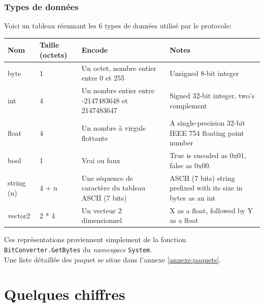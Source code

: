 \documentclass[a4paper]{article}
\begin{document}
\subsubsection{Types de données}
Voici un tableau résumant les 6 types de données utilisé par le protocole:
\begin{center}
\begin{tabular}{|l|m{1.5cm}|m{5cm}|m{5cm}|}
    \hline
    Nom & Taille (octets) & Encode & Notes \\
    \hline\hline
    byte & 1 & Un octet, nombre entier entre 0 et 255 & Unsigned 8-bit integer \\
    \hline
    int & 4 & Un nombre entier entre \mbox{-2147483648} et 2147483647  & Signed 32-bit integer, two's complement \\
    \hline
    float & 4 & Un nombre à virgule flottante & A single-precision 32-bit IEEE 754 floating point number \\
    \hline
    bool & 1 & Vrai ou faux & True is encoded as 0x01, false as 0x00. \\
    \hline
    string (n) & 4 + n & Une séquence de caractère du tableau ASCII (7 bits) & ASCII (7 bits) string prefixed with its size in bytes as an int \\
    \hline
    vector2 & 2 * 4 & Un vecteur 2 dimensionnel & X as a float, followed by Y as a float \\
    \hline
\end{tabular}
\end{center}
Ces représentations proviennent simplement de la fonction \texttt{BitConverter.GetBytes} du \textit{namespace} \cite{namespace} \texttt{System}. \\
Une liste détaillée des paquet se situe dans l'annexe \ref{annexe:paquets}.

\section{Quelques chiffres}
\label{section:chiffres}
\end{document}
